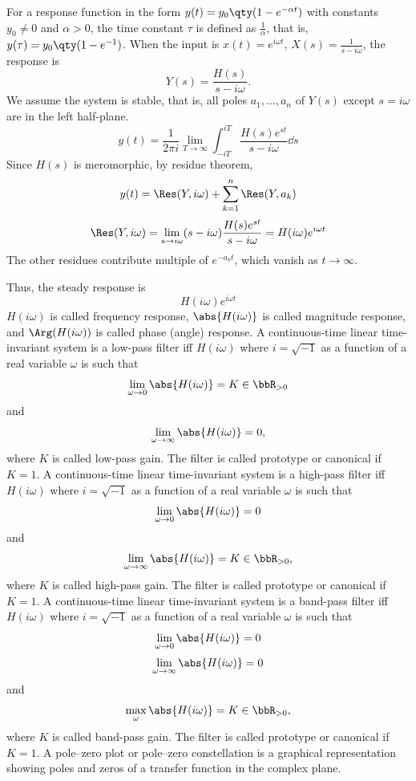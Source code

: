 \documentclass[a4paper,12pt]{report}
\begin{document}
For a response function in the form $y(t)=y_0\qty(1-e^{-\alpha t})$ with constants $y_0\neq 0$ and $\alpha>0$, the time constant $\tau$ is defined as $\frac{1}{\alpha}$, that is, $y(\tau)=y_0\qty(1-e^{-1})$.
When the input is $x(t)=e^{i\omega t}$, $X(s)=\frac{1}{s-i\omega}$, the response is
\[Y(s)=\frac{H(s)}{s-i\omega}.\]
We assume the system is stable, that is, all poles $a_1,\ldots,a_n$ of $Y(s)$ except $s=i\omega$ are in the left half-plane.
\[y(t)=\frac{1}{2\pi i}\lim_{T\to\infty}\int_{-iT}^{iT}\frac{H(s)e^{st}}{s-i\omega}\dd{s}\]
Since $H(s)$ is meromorphic, by residue theorem,
\[y(t)=\Res(Y,i\omega)+\sum_{k=1}^n\Res(Y,a_k)\]
\[\Res(Y,i\omega)=\lim_{s\to i\omega}(s-i\omega)\frac{H(s)e^{st}}{s-i\omega}=H(i\omega)e^{i\omega t}\]
The other residues contribute multiple of $e^{-a_kt}$, which vanish as $t\to\infty$.

Thus, the steady response is
\[H(i\omega)e^{i\omega t}\]
$H(i\omega)$ is called frequency response, $\abs{H(i\omega)}$ is called magnitude response, and $\Arg(H(i\omega))$ is called phase (angle) response.
A continuous-time linear time-invariant system is a low-pass filter iff $H(i\omega)$ where $i=\sqrt{-1}$ as a function of a real variable $\omega$ is such that
\[\lim_{\omega\to 0}\abs{H(i\omega)}=K\in\bbR_{>0}\]
and
\[\lim_{\omega\to\infty}\abs{H(i\omega)}=0,\]
where $K$ is called low-pass gain. The filter is called prototype or canonical if $K=1$.
A continuous-time linear time-invariant system is a high-pass filter iff $H(i\omega)$ where $i=\sqrt{-1}$ as a function of a real variable $\omega$ is such that
\[\lim_{\omega\to 0}\abs{H(i\omega)}=0\]
and
\[\lim_{\omega\to\infty}\abs{H(i\omega)}=K\in\bbR_{>0},\]
where $K$ is called high-pass gain. The filter is called prototype or canonical if $K=1$.
A continuous-time linear time-invariant system is a band-pass filter iff $H(i\omega)$ where $i=\sqrt{-1}$ as a function of a real variable $\omega$ is such that
\[\lim_{\omega\to 0}\abs{H(i\omega)}=0\]
\[\lim_{\omega\to\infty}\abs{H(i\omega)}=0\]
and
\[\max_{\omega}\abs{H(i\omega)}=K\in\bbR_{>0},\]
where $K$ is called band-pass gain. The filter is called prototype or canonical if $K=1$.
A pole–zero plot or pole–zero constellation is a graphical representation showing poles and zeros of a transfer function in the complex plane.
\end{document}
